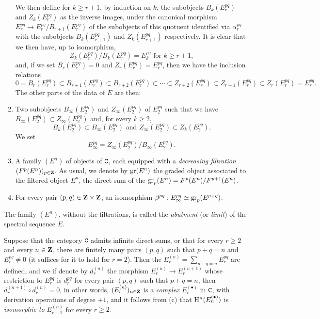 \begin{env}[11.1.1]
\begin{enumerate}[label=(\alph*)]
  We then define for $k\geqslant r+1$, by induction on $k$, the subobjects $B_k(E_r^{pq})$ and $Z_k(E_r^{pq})$ as the inverse images, under the canonical morphism $E_r^{pq}\to E_r^{pq}/B_{r+1}(E_r^{pq})$ of the subobjects of this quotuent identified via $\alpha_r^{pq}$ with the subobjects $B_k(E_{r+1}^{pq})$ and $Z_k(E_{r+1}^{pq})$ respectively.
It is clear that we then have, up to isomorphism,
  \[
    Z_k(E_r^{pq})/B_k(E_r^{pq})=E_k^{pq}\text{ for }k\geqslant r+1,
    \tag{11.1.1.1}
  \]
  and, if we set $B_r(E_r^{pq})=0$ and $Z_r(E_r^{pq})=E_r^{pq}$, then we have the inclusion relations
  \[
    0=B_r(E_r^{pq})\subset B_{r+1}(E_r^{pq})\subset B_{r+2}(E_r^{pq})\subset\cdots\subset Z_{r+2}(E_r^{pq})\subset Z_{r+1}(E_r^{pq})\subset Z_r(E_r^{pq})=E_r^{pq}.
    \tag{11.1.1.2}
  \]
  The other parts of the data of $E$ are then:
  \item Two subobjects $B_\infty(E_2^{pq})$ and $Z_\infty(E_2^{pq})$ of $E_2^{pq}$ such that we have $B_\infty(E_2^{pq})\subset Z_\infty(E_2^{pq})$ and, for every $k\geqslant 2$,
    \[
      B_k(E_2^{pq})\subset B_\infty(E_2^{pq})\text{ and }Z_\infty(E_2^{pq})\subset Z_k(E_2^{pq}).
    \]
    We set
    \[
      E_\infty^{pq}=Z_\infty(E_2^{pq})/B_\infty(E_2^{pq}).
      \tag{11.1.1.3}
    \]
  \item
{}
    A family $(E^n)$ of objects of $\mathtt{C}$, each equipped with a \emph{decreasing filtration $(F^p(E^n))_{p\in\mathbf{Z}}$}.
    As usual, we denote by ${\mathop{\mathrm{gr}}\nolimits}(E^n)$ the graded object associated to the filtered object $E^n$, the direct sum of the ${\mathop{\mathrm{gr}}\nolimits}_p(E^n)=F^p(E^n)/F^{p+1}(E^n)$.
  \item For every pair $(p,q)\in\mathbf{Z}\times\mathbf{Z}$, an isomorphism $\beta^{pq}:E_\infty^{pq}\simeq{\mathop{\mathrm{gr}}\nolimits}_p(E^{p+q})$.
\end{enumerate}

The family $(E^n)$, without the filtrations, is called the \emph{abutment} (or \emph{limit}) of the spectral sequence $E$.

Suppose that the category $\mathtt{C}$ admits infinite direct sums, or that for every $r\geqslant 2$ and every $n\in\mathbf{Z}$, there are finitely many pairs $(p,q)$ such that $p+q=n$ and $E_r^{pq}\neq 0$ (it suffices for it to hold for $r=2$).
Then the $E_r^{(n)}=\sum_{p+q=n}E_r^{pq}$ are defined, and we if denote by $d_r^{(n)}$ the morphism $E_r^{(n)}\to E_r^{(n+1)}$ whose restriction to $E_r^{pq}$ is $d_r^{pq}$ for every pair $(p,q)$ such that $p+q=n$, then $d_r^{(n+1)}\circ d_r^{(n)}=0$, in other words, $(E_r^{(n)})_{n\in\mathbf{Z}}$ is a \emph{complex $E_r^{(\bullet)}$} in $\mathtt{C}$, with derivation operations of degree $+1$, and it follows from (c) that $\mathrm{H}^n(E_n^{(\bullet)})$ is \emph{isomorphic to $E_{r+1}^{(n)}$} for every $r\geqslant 2$.
\end{env}

